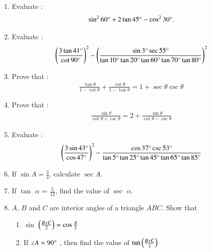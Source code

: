 \begin{enumerate}
\hfill{}\item Evaluate :
 \begin{align*}
	     \sin^{2}{60\degree} + 2\tan{45\degree} - \cos^{2}{30\degree}. 
      \end{align*}

\hfill{}\item Evaluate :
\begin{align*}
\left(\frac{3\tan 41\degree}{\cot 90\degree}\right)^2 - \left(\frac{\sin 3\degree \sec 55\degree}{\tan 10\degree \tan 20\degree \tan 60\degree \tan 70\degree \tan 80\degree}\right)^2
\end{align*}

\hfill{}\item Prove that :
\begin{align*}
\frac{\tan \theta}{1-\cot \theta} + \frac{\cot \theta}{1- \tan \theta} = 1+ \sec \theta  \csc  \theta   
\end{align*}

\hfill{}\item Prove that :
\begin{align*}
    \frac{\sin \theta}{\cot \theta + \csc \theta} = 2 + \frac{\sin \theta}{\cot \theta - \csc \theta}
\end{align*}

\hfill{}\item Evaluate :
\begin{align*}
\left(\frac{3\sin 43\degree}{\cos 47\degree}\right)^2 - \frac{\cos 37\degree \csc 53\degree}{\tan 5\degree \tan 25\degree \tan 45\degree \tan 65\degree \tan 85\degree}
\end{align*}


 \hfill{}\item If $\sin A = \frac{3}{4}$, calculate $\sec A$.


\hfill{}\item If $\tan$ $\alpha$ = ${\frac {5}{12}}$, find the value of $\sec$ $\alpha$.

\hfill{}\item $A$, $B$ and $C$ are interior angles of a triangle $ABC$. Show that
\begin{enumerate}
\item  $\sin$ $ \left({\frac {B+C}{2}}\right) = \cos {\frac {A}{2}}$
\item  If $\angle A = 90 \degree$ , then find the value of $\tan \left({\frac{B+C}{2}}\right)$ 
\end{enumerate} 


\end{enumerate}
